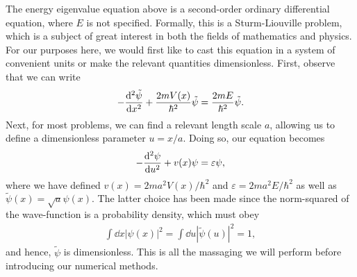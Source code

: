 The energy eigenvalue equation above is a second-order ordinary differential equation, where $E$ is not specified.
Formally, this is a Sturm-Liouville problem, which is a subject of great interest in both the fields of mathematics and physics.
For our purposes here, we would first like to cast this equation in a system of convenient units or make the relevant quantities dimensionless.
First, observe that we can write
\begin{align}
    -\dv[2]{\tilde{\psi}}{x} + \frac{2 m V(x)}{\hbar^2} \tilde{\psi} = \frac{2 m E}{\hbar^2} \tilde{\psi}
.\end{align}
Next, for most problems, we can find a relevant length scale $a$, allowing us to define a dimensionless parameter $u = x/a$.
Doing so, our equation becomes
\begin{align}
\label{eq:dimless-SE}
    -\dv[2]{\psi}{u} + v(x) \psi = \varepsilon \psi
,\end{align}
where we have defined $v(x) = 2 m a^2 V(x) / \hbar^2$ and $\varepsilon = 2 m a^2 E / \hbar^2$ as well as $\tilde{\psi}(x) = \sqrt{a} \psi(x)$.
The latter choice has been made since the norm-squared of the wave-function is a probability density, which must obey
\begin{align}
    \int \dd{x} |\psi(x)|^2 = \int \dd{u} |\tilde{\psi}(u)|^2 = 1
,\end{align}
and hence, $\tilde{\psi}$ is dimensionless.
This is all the massaging we will perform before introducing our numerical methods.


